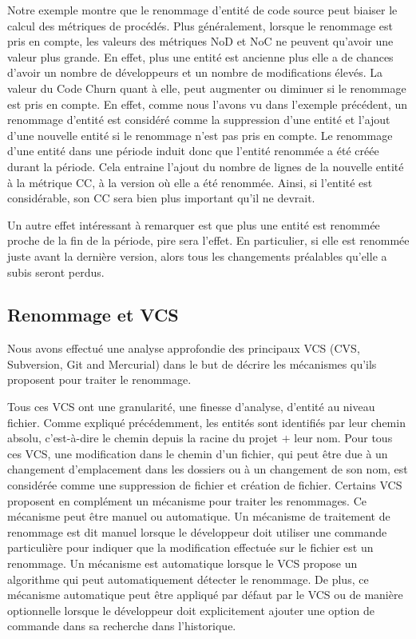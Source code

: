 Notre exemple montre que le renommage d'entité de code source peut biaiser le calcul des métriques de procédés. Plus généralement, lorsque le renommage est pris en compte, les valeurs des métriques NoD et NoC ne peuvent qu'avoir une valeur plus grande. En effet, plus une entité est ancienne plus elle a de chances d'avoir un nombre de développeurs et un nombre de modifications élevés. La valeur du Code Churn quant à elle, peut augmenter ou diminuer si le renommage est pris en compte. En effet, comme nous l'avons vu dans l'exemple précédent, un renommage d'entité est considéré comme la suppression d'une entité et l'ajout d'une nouvelle entité si le renommage n'est pas pris en compte. Le renommage d'une entité dans une période induit donc que l'entité renommée a été créée durant la période. Cela entraine l'ajout du nombre de lignes de la nouvelle entité à la métrique CC, à la version où elle a été renommée. Ainsi, si l'entité est considérable, son CC sera bien plus important qu'il ne devrait. 

Un autre effet intéressant à remarquer est que plus une entité est renommée proche de la fin de la période, pire sera l'effet. En particulier, si elle est renommée juste avant la dernière version, alors tous les changements préalables qu'elle a subis seront perdus.\\

\subsection{Renommage et VCS}
  
Nous avons effectué une analyse approfondie des principaux VCS (CVS, Subversion, Git and Mercurial) dans le but de décrire les mécanismes qu'ils proposent pour traiter le renommage. 

Tous ces VCS ont une granularité, une finesse d'analyse, d'entité au niveau fichier. Comme expliqué précédemment, les entités sont identifiés par leur chemin absolu, c'est-à-dire le chemin depuis la racine du projet $+$ leur nom. Pour tous ces VCS, une modification dans le chemin d'un fichier, qui peut être due à un changement d'emplacement dans les dossiers ou à un changement de son nom, est considérée comme une suppression de fichier et création de fichier. Certains VCS proposent en complément un mécanisme pour traiter les renommages. Ce mécanisme peut être manuel ou automatique. Un mécanisme de traitement de renommage est dit manuel lorsque le développeur doit utiliser une commande particulière pour indiquer que la modification effectuée sur le fichier est un renommage. Un mécanisme est automatique lorsque le VCS propose un algorithme qui peut automatiquement détecter le renommage. De plus, ce mécanisme automatique peut être appliqué par défaut par le VCS ou de manière optionnelle lorsque le développeur doit explicitement ajouter une option de commande dans sa recherche dans l'historique.\\
 
